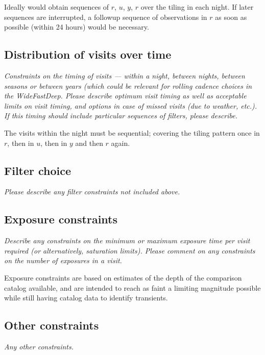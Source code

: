 \documentclass[11pt]{article}
\begin{document}
Ideally would obtain sequences of $r$, $u$, $y$, $r$ over the tiling in each night. If later sequences are interrupted, a
followup sequence of observations in $r$ as soon as possible (within 24 hours) would be necessary. 

\subsection{Distribution of visits over time}
\begin{footnotesize}{\it Constraints on the timing of visits --- within a night, between nights, between seasons or
between years (which could be relevant for rolling cadence choices in the WideFastDeep. 
Please describe optimum visit timing as well as acceptable limits on visit timing, and options in
case of missed visits (due to weather, etc.). If this timing should include particular sequences
of filters, please describe.}
\end{footnotesize}

The visits within the night must be sequential; covering the tiling pattern once in $r$, then in $u$, then in $y$ and then $r$ again.

\subsection{Filter choice}
\begin{footnotesize}
{\it Please describe any filter constraints not included above.}
\end{footnotesize}

\subsection{Exposure constraints}
\begin{footnotesize}
{\it Describe any constraints on the minimum or maximum exposure time per visit required (or alternatively, saturation limits).
Please comment on any constraints on the number of exposures in a visit.}
\end{footnotesize}

Exposure constraints are based on estimates of the depth of the comparison catalog available, and are intended to
reach as faint a limiting magnitude possible while still having catalog data to identify transients.

\subsection{Other constraints}
\begin{footnotesize}
{\it Any other constraints.}
\end{footnotesize}
\end{document}

